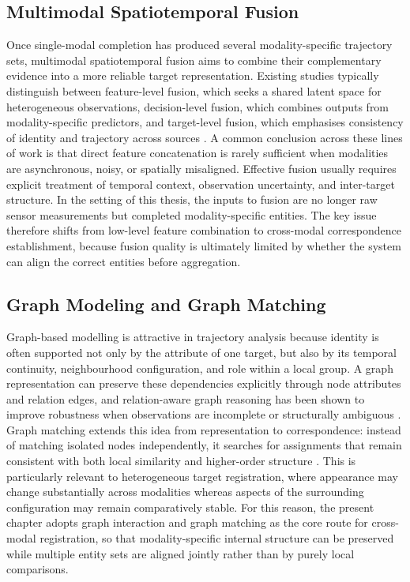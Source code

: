 \subsection{Multimodal Spatiotemporal Fusion}
Once single-modal completion has produced several modality-specific trajectory sets, multimodal spatiotemporal fusion aims to combine their complementary evidence into a more reliable target representation. Existing studies typically distinguish between feature-level fusion, which seeks a shared latent space for heterogeneous observations, decision-level fusion, which combines outputs from modality-specific predictors, and target-level fusion, which emphasises consistency of identity and trajectory across sources \cite{wu2024jointsemantic,chen2026multimodal,zhang2025optsar}. A common conclusion across these lines of work is that direct feature concatenation is rarely sufficient when modalities are asynchronous, noisy, or spatially misaligned. Effective fusion usually requires explicit treatment of temporal context, observation uncertainty, and inter-target structure. In the setting of this thesis, the inputs to fusion are no longer raw sensor measurements but completed modality-specific entities. The key issue therefore shifts from low-level feature combination to cross-modal correspondence establishment, because fusion quality is ultimately limited by whether the system can align the correct entities before aggregation.

\subsection{Graph Modeling and Graph Matching}
Graph-based modelling is attractive in trajectory analysis because identity is often supported not only by the attribute of one target, but also by its temporal continuity, neighbourhood configuration, and role within a local group. A graph representation can preserve these dependencies explicitly through node attributes and relation edges, and relation-aware graph reasoning has been shown to improve robustness when observations are incomplete or structurally ambiguous \cite{zhao2022graphreg,fu2023deepgraphmatching,liu2024s2anet}. Graph matching extends this idea from representation to correspondence: instead of matching isolated nodes independently, it searches for assignments that remain consistent with both local similarity and higher-order structure \cite{gold1996softassign,fu2023deepgraphmatching}. This is particularly relevant to heterogeneous target registration, where appearance may change substantially across modalities whereas aspects of the surrounding configuration may remain comparatively stable. For this reason, the present chapter adopts graph interaction and graph matching as the core route for cross-modal registration, so that modality-specific internal structure can be preserved while multiple entity sets are aligned jointly rather than by purely local comparisons.

